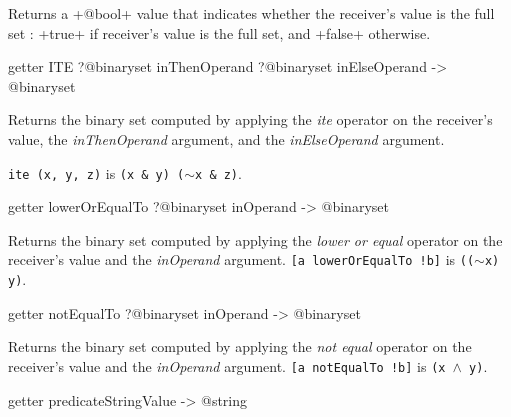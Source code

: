Returns a \ggs+@bool+ value that indicates whether the receiver's value is the full set : \ggs+true+ if receiver's value is the full set, and \ggs+false+ otherwise.








\begin{galgas}
getter ITE ?@binaryset inThenOperand ?@binaryset inElseOperand -> @binaryset
\end{galgas}


Returns the binary set computed by applying the \emph{ite} operator on the receiver's value, the \emph{inThenOperand} argument, and the  \emph{inElseOperand} argument.

{\texttt{ite (x, y, z)} is \texttt{(x \& y) \textbar ($\sim$x \& z)}.}








\begin{galgas}
getter lowerOrEqualTo ?@binaryset inOperand -> @binaryset
\end{galgas}


Returns the binary set computed by applying the \emph{lower or equal} operator on the receiver's value and the \emph{inOperand} argument.
{\texttt{[a lowerOrEqualTo !b]} is \texttt{(($\sim$x) \textbar y)}.}








\begin{galgas}
getter notEqualTo ?@binaryset inOperand -> @binaryset
\end{galgas}


Returns the binary set computed by applying the \emph{not equal} operator on the receiver's value and the \emph{inOperand} argument.
{\texttt{[a notEqualTo !b]} is \texttt{(x $\wedge$ y)}.}








\begin{galgas}
getter predicateStringValue -> @string
\end{galgas}

